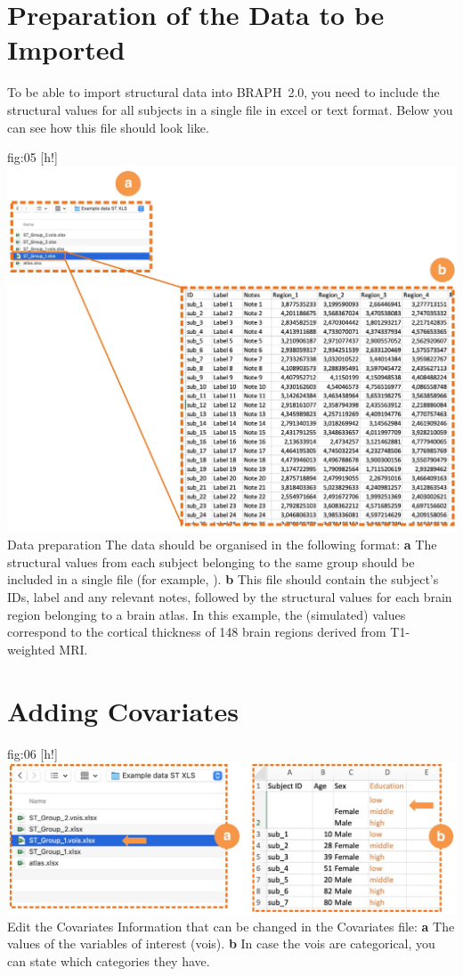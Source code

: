 \documentclass[justified]{tufte-handout}
\begin{document}
\clearpage
\section{Preparation of the Data to be Imported}

To be able to import structural data into BRAPH~2.0, you need to include the structural values for all subjects in a single file in excel or text format. Below you can see how this file should look like.

	{fig:05}
	{
	[h!]
	\includegraphics{fig05.jpg}
	}
	{Data preparation}
	{
	The data should be organised in the following format:
	{\bf a} The structural values from each subject belonging to the same group should be included in a single file (for example, ). 
	{\bf b} This file should contain the subject's IDs, label and any relevant notes, followed by the structural values for each brain region belonging to a brain atlas. In this example, the (simulated) values correspond to the cortical thickness of 148 brain regions derived from T1-weighted MRI.
	} 

\section{Adding Covariates}

	{fig:06}
	{
	[h!]
	\includegraphics{fig06.jpg}
	}
	{Edit the Covariates}
	{
	Information that can be changed in the Covariates file: 
	{\bf a} The values of the variables of interest (vois).
	{\bf b} In case the vois are categorical, you can state which categories they have.
	}
	
\end{document}
